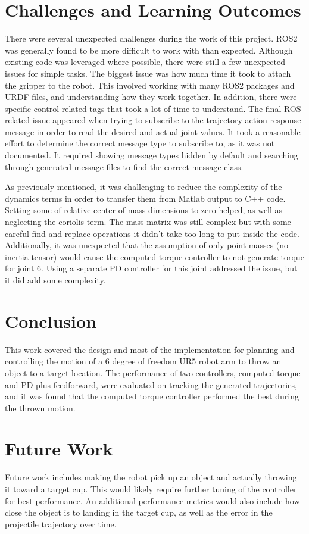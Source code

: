 \documentclass[conference]{IEEEtran}
\begin{document}
\section{Challenges and Learning Outcomes}
There were several unexpected challenges during the work of this project. ROS2
was generally found to be more difficult to work with than expected. Although
existing code was leveraged where possible, there were still a few unexpected
issues for simple tasks. The biggest issue was how much time it took to attach
the gripper to the robot. This involved working with many ROS2 packages and URDF
files, and understanding how they work together. In addition, there were
specific control related tags that took a lot of time to understand. The final
ROS related issue appeared when trying to subscribe to the trajectory action
response message in order to read the desired and actual joint values. It took a
reasonable effort to determine the correct message type to subscribe to, as it
was not documented. It required showing message types hidden by default and
searching through generated message files to find the correct message class.

As previously mentioned, it was challenging to reduce the complexity of the
dynamics terms in order to transfer them from Matlab output to C++ code. Setting
some of relative center of mass dimensions to zero helped, as well as neglecting
the coriolis term. The mass matrix was still complex but with some careful find
and replace operations it didn't take too long to put inside the
code. Additionally, it was unexpected that the assumption of only point masses
(no inertia tensor) would cause the computed torque controller to not
generate torque for joint 6. Using a separate PD controller for this joint
addressed the issue, but it did add some complexity.

\section{Conclusion}
This work covered the design and most of the implementation for planning and
controlling the motion of a 6 degree of freedom UR5 robot arm to throw an object
to a target location. The performance of two controllers, computed torque and PD
plus feedforward, were evaluated on tracking the generated trajectories, and it
was found that the computed torque controller performed the best during the
thrown motion.

\section{Future Work}
Future work includes making the robot pick up an object and actually throwing it
toward a target cup. This would likely require further tuning of the controller
for best performance. An additional performance metrics would also include how
close the object is to landing in the target cup, as well as the error in the
projectile trajectory over time.




\end{document}
